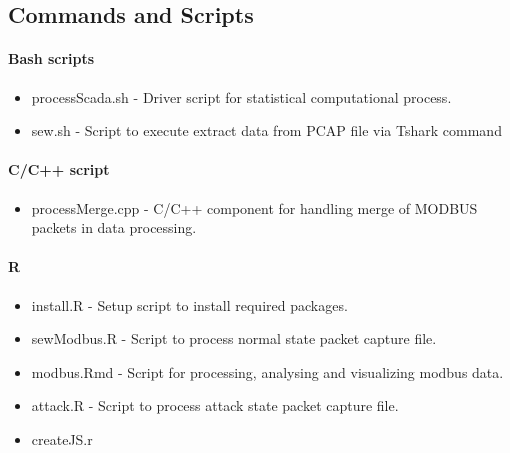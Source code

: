 \documentclass[11pt,]{article}
\begin{document}
\subsection*{Commands and Scripts}\label{commands-and-scripts}

\paragraph*{Bash scripts}\label{bash-scripts}

\begin{itemize}
\itemsep1pt\parskip0pt
\item
  processScada.sh - Driver script for statistical computational process.
\item
  sew.sh - Script to execute extract data from PCAP file via Tshark
  command
\end{itemize}

\paragraph*{C/C++ script}\label{cc-script}

\begin{itemize}
\itemsep1pt\parskip0pt
\item
  processMerge.cpp - C/C++ component for handling merge of MODBUS
  packets in data processing.
\end{itemize}

\paragraph*{R}\label{r}

\begin{itemize}
\itemsep1pt\parskip0pt
\item
  install.R - Setup script to install required packages.
\item
  sewModbus.R - Script to process normal state packet capture file.
\item
  modbus.Rmd - Script for processing, analysing and visualizing modbus
  data.
\item
  attack.R - Script to process attack state packet capture file.
\item
  createJS.r
\end{itemize}
\end{document}
